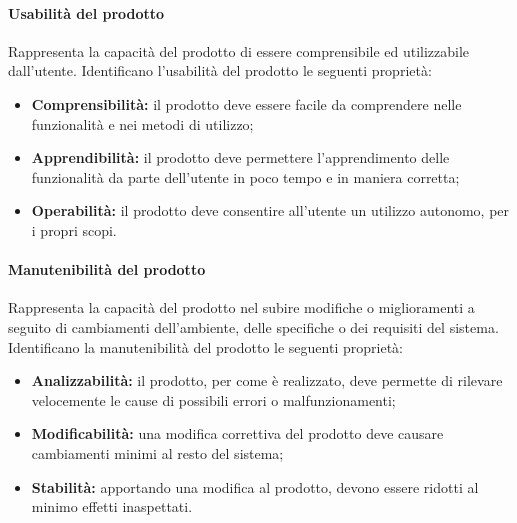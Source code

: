 \paragraph{Usabilità del prodotto}
Rappresenta la capacità del prodotto di essere comprensibile ed utilizzabile dall'utente. Identificano l'usabilità del prodotto le seguenti proprietà:
\begin{itemize}
	\item \textbf{Comprensibilità:} il prodotto deve essere facile da comprendere nelle funzionalità e nei metodi di utilizzo;
	\item \textbf{Apprendibilità:} il prodotto deve permettere l'apprendimento delle funzionalità da parte dell'utente in poco tempo e in maniera corretta;
	\item \textbf{Operabilità:} il prodotto deve consentire all'utente un utilizzo autonomo, per i propri scopi.
\end{itemize}

\paragraph{Manutenibilità del prodotto}
Rappresenta la capacità del prodotto nel subire modifiche o miglioramenti a seguito di cambiamenti dell'ambiente, delle specifiche o dei requisiti del sistema. Identificano la manutenibilità del prodotto le seguenti proprietà:
\begin{itemize}
	\item \textbf{Analizzabilità:} il prodotto, per come è realizzato, deve permette di rilevare velocemente le cause di possibili errori o malfunzionamenti;
	\item \textbf{Modificabilità:} una modifica correttiva del prodotto deve causare cambiamenti minimi al resto del sistema;
	\item \textbf{Stabilità:} apportando una modifica al prodotto, devono essere ridotti al minimo effetti inaspettati.
\end{itemize}


